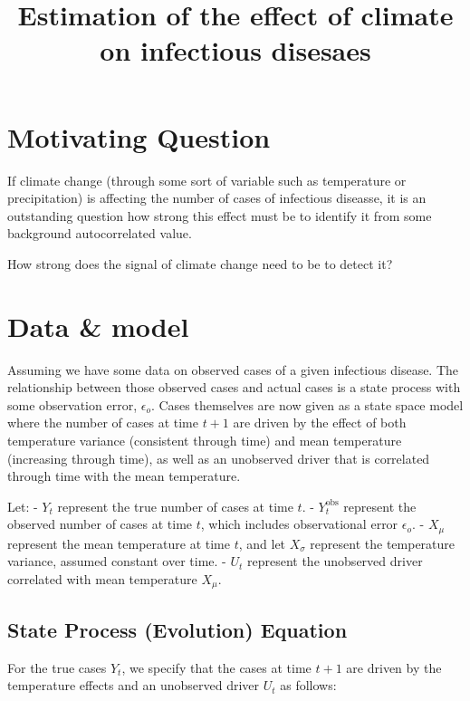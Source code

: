 \documentclass[
  letterpaper,
  DIV=11,
  numbers=noendperiod]{scrartcl}
\title{Estimation of the effect of climate on infectious disesaes}
\author{}
\date{}
\renewcommand*\contentsname{Table of contents}
\newcommand\contentsname{Table of contents}
\begin{document}
\maketitle

\renewcommand*\contentsname{Table of contents}
{
\hypersetup{linkcolor=}
\setcounter{tocdepth}{3}
\tableofcontents
}
\section{Motivating Question}\label{motivating-question}

If climate change (through some sort of variable such as temperature or
precipitation) is affecting the number of cases of infectious diseasse,
it is an outstanding question how strong this effect must be to identify
it from some background autocorrelated value.

How strong does the signal of climate change need to be to detect it?

\section{Data \& model}\label{data-model}

Assuming we have some data on observed cases of a given infectious
disease. The relationship between those observed cases and actual cases
is a state process with some observation error, \(\epsilon_o\). Cases
themselves are now given as a state space model where the number of
cases at time \(t+1\) are driven by the effect of both temperature
variance (consistent through time) and mean temperature (increasing
through time), as well as an unobserved driver that is correlated
through time with the mean temperature.

Let: - \(Y_t\) represent the true number of cases at time \(t\). -
\(Y_t^{\text{obs}}\) represent the observed number of cases at time
\(t\), which includes observational error \(\epsilon_o\). - \(X_{\mu}\)
represent the mean temperature at time \(t\), and let \(X_{\sigma}\)
represent the temperature variance, assumed constant over time. -
\(U_t\) represent the unobserved driver correlated with mean temperature
\(X_{\mu}\).

\subsection{State Process (Evolution)
Equation}\label{state-process-evolution-equation}

For the true cases \(Y_t\), we specify that the cases at time \(t+1\)
are driven by the temperature effects and an unobserved driver \(U_t\)
as follows:
\end{document}
